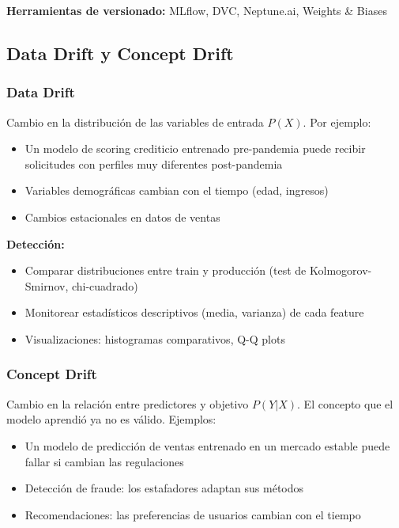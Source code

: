 \documentclass[11pt,a4paper]{article}
\begin{document}
\textbf{Herramientas de versionado:} MLflow, DVC, Neptune.ai, Weights \& Biases

\subsection{Data Drift y Concept Drift}

\subsubsection{Data Drift}

Cambio en la distribución de las variables de entrada $P(X)$. Por ejemplo:

\begin{itemize}
\item Un modelo de scoring crediticio entrenado pre-pandemia puede recibir solicitudes con perfiles muy diferentes post-pandemia
\item Variables demográficas cambian con el tiempo (edad, ingresos)
\item Cambios estacionales en datos de ventas
\end{itemize}

\textbf{Detección:}
\begin{itemize}
\item Comparar distribuciones entre train y producción (test de Kolmogorov-Smirnov, chi-cuadrado)
\item Monitorear estadísticos descriptivos (media, varianza) de cada feature
\item Visualizaciones: histogramas comparativos, Q-Q plots
\end{itemize}

\subsubsection{Concept Drift}

Cambio en la relación entre predictores y objetivo $P(Y|X)$. El concepto que el modelo aprendió ya no es válido. Ejemplos:

\begin{itemize}
\item Un modelo de predicción de ventas entrenado en un mercado estable puede fallar si cambian las regulaciones
\item Detección de fraude: los estafadores adaptan sus métodos
\item Recomendaciones: las preferencias de usuarios cambian con el tiempo
\end{itemize}
\end{document}
